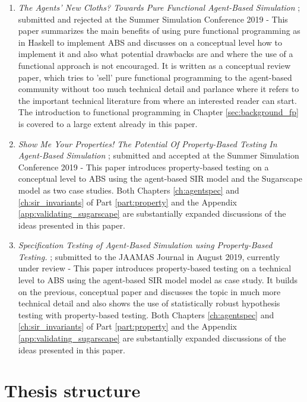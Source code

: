 \begin{enumerate}
	\item \textit{The Agents' New Cloths? Towards Pure Functional Agent-Based Simulation} \cite{thaler_agents_2019}; submitted and rejected at the Summer Simulation Conference 2019 - This paper summarizes the main benefits of using pure functional programming as in Haskell to implement ABS and discusses on a conceptual level how to implement it and also what potential drawbacks are and where the use of a functional approach is not encouraged. It is written as a conceptual review paper, which tries to 'sell' pure functional programming to the agent-based community without too much technical detail and parlance where it refers to the important technical literature from where an interested reader can start. The introduction to functional programming in Chapter \ref{sec:background_fp} is covered to a large extent already in this paper.
	
	\item \textit{Show Me Your Properties! The Potential Of Property-Based Testing In Agent-Based Simulation} \cite{thaler_show_2019}; submitted and accepted at the Summer Simulation Conference 2019 - This paper introduces property-based testing on a conceptual level to ABS using the agent-based SIR model and the Sugarscape model as two case studies. Both Chapters \ref{ch:agentspec} and \ref{ch:sir_invariants} of Part \ref{part:property} and the Appendix \ref{app:validating_sugarscape} are substantially expanded discussions of the ideas presented in this paper.
	
	\item \textit{Specification Testing of Agent-Based Simulation using Property-Based Testing.} \cite{thaler_specification_2019}; submitted to the JAAMAS Journal in August 2019, currently under review - This paper introduces property-based testing on a technical level to ABS using the agent-based SIR model model as case study. It builds on the previous, conceptual paper and discusses the topic in much more technical detail and also shows the use of statistically robust hypothesis testing with property-based testing. Both Chapters \ref{ch:agentspec} and \ref{ch:sir_invariants} of Part \ref{part:property} and the Appendix \ref{app:validating_sugarscape} are substantially expanded discussions of the ideas presented in this paper.
\end{enumerate}


\section{Thesis structure}


